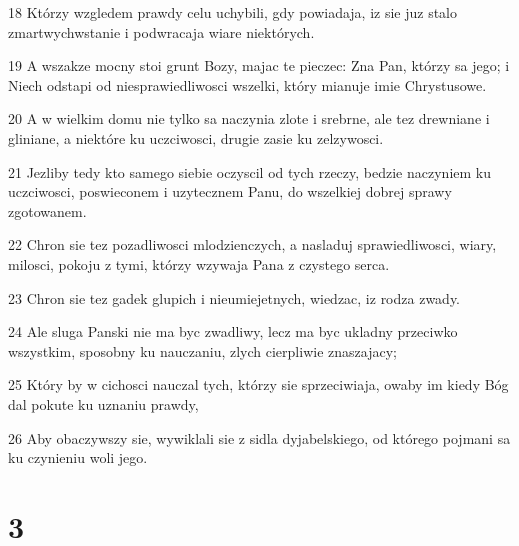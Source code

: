 \par 18 Którzy wzgledem prawdy celu uchybili, gdy powiadaja, iz sie juz stalo zmartwychwstanie i podwracaja wiare niektórych.
\par 19 A wszakze mocny stoi grunt Bozy, majac te pieczec: Zna Pan, którzy sa jego; i Niech odstapi od niesprawiedliwosci wszelki, który mianuje imie Chrystusowe.
\par 20 A w wielkim domu nie tylko sa naczynia zlote i srebrne, ale tez drewniane i gliniane, a niektóre ku uczciwosci, drugie zasie ku zelzywosci.
\par 21 Jezliby tedy kto samego siebie oczyscil od tych rzeczy, bedzie naczyniem ku uczciwosci, poswieconem i uzytecznem Panu, do wszelkiej dobrej sprawy zgotowanem.
\par 22 Chron sie tez pozadliwosci mlodzienczych, a nasladuj sprawiedliwosci, wiary, milosci, pokoju z tymi, którzy wzywaja Pana z czystego serca.
\par 23 Chron sie tez gadek glupich i nieumiejetnych, wiedzac, iz rodza zwady.
\par 24 Ale sluga Panski nie ma byc zwadliwy, lecz ma byc ukladny przeciwko wszystkim, sposobny ku nauczaniu, zlych cierpliwie znaszajacy;
\par 25 Który by w cichosci nauczal tych, którzy sie sprzeciwiaja, owaby im kiedy Bóg dal pokute ku uznaniu prawdy,
\par 26 Aby obaczywszy sie, wywiklali sie z sidla dyjabelskiego, od którego pojmani sa ku czynieniu woli jego.

\chapter{3}

